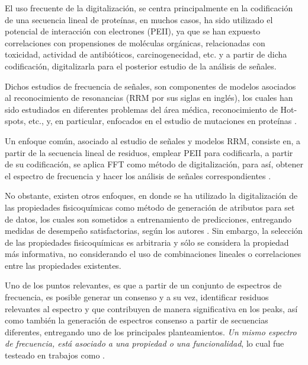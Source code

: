 El uso frecuente de la digitalización, se centra principalmente en la codificación de una secuencia lineal de proteínas, en muchos casos, ha sido utilizado el potencial de interacción con electrones (PEII), ya que se han expuesto correlaciones con propensiones de moléculas orgánicas, relacionadas con toxicidad, actividad de antibióticos, carcinogenecidad, etc. \cite{veljkovic1985possible, cosic1994macromolecular, cosic1987prediction} y a partir de dicha codificación, digitalizarla para el posterior estudio de la análisis de señales.

Dichos estudios de frecuencia de señales, son componentes de modelos asociados al reconocimiento de resonancias (RRM por sus siglas en inglés), los cuales han sido estudiados en diferentes problemas del área médica, reconocimiento de Hot-spots, etc., y, en particular, enfocados en el estudio de mutaciones en proteínas \cite{cosic1994macromolecular, cosic2016analysis, cosic1987prediction}. 

Un enfoque común, asociado al estudio de señales y modelos RRM, consiste en, a partir de la secuencia lineal de residuos, emplear PEII para codificarla, a partir de su codificación, se aplica FFT como método de digitalización, para así, obtener el espectro de frecuencia y hacer los análisis de señales correspondientes \cite{veljkovic1985possible, cosic1994macromolecular, cosic2016analysis, cosic1987prediction}.

No obstante, existen otros enfoques, en donde se ha utilizado la digitalización de las propiedades fisicoquímicas como método de generación de atributos para set de datos, los cuales son sometidos a entrenamiento de predicciones, entregando medidas de desempeño satisfactorias, según los autores \cite{cadet2018application}. Sin embargo, la selección de las propiedades fisicoquímicas es arbitraria y sólo se considera la propiedad más informativa, no considerando el uso de combinaciones lineales o correlaciones entre las propiedades existentes.

Uno de los puntos relevantes, es que a partir de un conjunto de espectros de frecuencia, es posible generar un consenso y a su vez, identificar residuos relevantes al espectro y que contribuyen de manera significativa en los peaks, así como también la generación de espectros consenso a partir de secuencias diferentes, entregando uno de los principales planteamientos. \textit{Un mismo espectro de frecuencia, está asociado a una propiedad o una funcionalidad}, lo cual fue testeado en trabajos como \cite{veljkovic1985possible}. 


